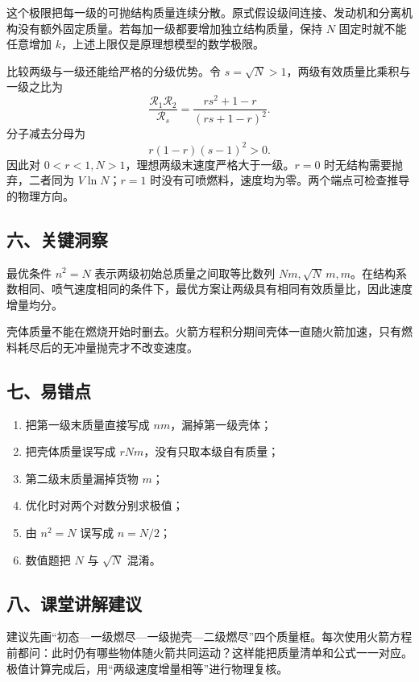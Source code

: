 \documentclass[12pt,a4paper,UTF8]{ctexart}
\newcommand{\tightlist}{\setlength{\itemsep}{0pt}\setlength{\parskip}{0pt}}
\begin{document}
这个极限把每一级的可抛结构质量连续分散。原式假设级间连接、发动机和分离机构没有额外固定质量。若每加一级都要增加独立结构质量，保持
\(N\) 固定时就不能任意增加 \(k\)，上述上限仅是原理想模型的数学极限。

比较两级与一级还能给严格的分级优势。令
\(s=\sqrt N>1\)，两级有效质量比乘积与一级之比为 \[
\frac{\mathcal R_1\mathcal R_2}{\mathcal R_s}
=\frac{rs^2+1-r}{(rs+1-r)^2}.
\] 分子减去分母为 \[
r(1-r)(s-1)^2>0.
\] 因此对 \(0<r<1,N>1\)，理想两级末速度严格大于一级。\(r=0\)
时无结构需要抛弃，二者同为 \(V\ln N\)；\(r=1\)
时没有可喷燃料，速度均为零。两个端点可检查推导的物理方向。

\subsection{六、关键洞察}\label{ux516dux5173ux952eux6d1eux5bdf-1}

最优条件 \(n^2=N\) 表示两级初始总质量之间取等比数列
\(Nm,\sqrt N\,m,m\)。在结构系数相同、喷气速度相同的条件下，最优方案让两级具有相同有效质量比，因此速度增量均分。

壳体质量不能在燃烧开始时删去。火箭方程积分期间壳体一直随火箭加速，只有燃料耗尽后的无冲量抛壳才不改变速度。

\subsection{七、易错点}\label{ux4e03ux6613ux9519ux70b9-1}

\begin{enumerate}
\def\labelenumi{\arabic{enumi}.}
\tightlist
\item
  把第一级末质量直接写成 \(nm\)，漏掉第一级壳体；
\item
  把壳体质量误写成 \(rNm\)，没有只取本级自有质量；
\item
  第二级末质量漏掉货物 \(m\)；
\item
  优化时对两个对数分别求极值；
\item
  由 \(n^2=N\) 误写成 \(n=N/2\)；
\item
  数值题把 \(N\) 与 \(\sqrt N\) 混淆。
\end{enumerate}

\subsection{八、课堂讲解建议}\label{ux516bux8bfeux5802ux8bb2ux89e3ux5efaux8bae-1}

建议先画``初态---一级燃尽---一级抛壳---二级燃尽''四个质量框。每次使用火箭方程前都问：此时仍有哪些物体随火箭共同运动？这样能把质量清单和公式一一对应。极值计算完成后，用``两级速度增量相等''进行物理复核。
\end{document}
